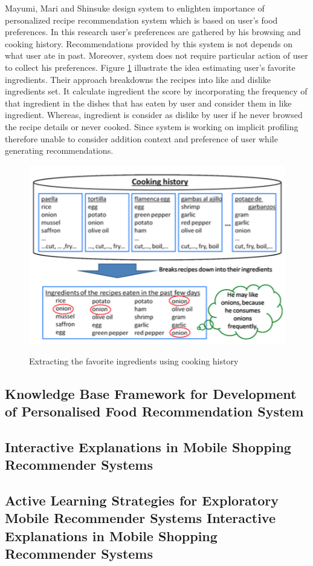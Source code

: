 Mayumi, Mari and Shinsuke \cite{ueda2011user} design system to enlighten importance of personalized recipe recommendation system which is based on user’s food preferences. In this research user’s preferences are gathered by his browsing and cooking history. Recommendations provided by this system is not depends on what user ate in past. Moreover, system does not require particular action of user to collect his preferences.  Figure \ref{fig:ch_ueda2011user} illustrate the idea estimating user’s favorite ingredients. Their approach breakdowns the recipes into like and dislike ingredients set. It calculate ingredient the score by incorporating the frequency of that ingredient in the dishes that has eaten by user and consider them in like ingredient. Whereas, ingredient is consider as dislike by user if he never browsed the recipe details or never cooked. Since system is working on implicit profiling therefore unable to consider addition context and preference of user while generating recommendations.

\begin{figure}[h]
	\centering
	\includegraphics[width=1\linewidth]{figures/ch_ueda2011user.png}
	\caption{Extracting the favorite ingredients using cooking history}
	\cite{ueda2011user}
	\label{fig:ch_ueda2011user}
\end{figure}

 

\subsection{Knowledge Base Framework for Development of Personalised Food Recommendation System}

\subsection{Interactive Explanations in Mobile Shopping Recommender Systems}

\subsection{Active Learning Strategies for Exploratory Mobile Recommender Systems Interactive Explanations in Mobile Shopping Recommender Systems}